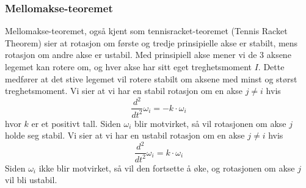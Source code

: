 \subsubsection{Mellomakse-teoremet}
Mellomakse-teoremet, også kjent som tennisracket-teoremet (Tennis Racket Theorem) \cite{DAMME:1} sier at rotasjon om første og tredje prinsipielle akse er stabilt, mens rotasjon om andre akse er ustabil. Med prinsipiell akse mener vi de $3$ aksene legemet kan rotere om, og hver akse har sitt eget treghetsmoment $I$. Dette medfører at det stive legemet vil rotere stabilt om aksene med minst og størst treghetsmoment.\newline\newline
Vi sier at vi har en stabil rotasjon om en akse $j\ne i$ hvis
\begin{equation}
\label{eqn:stabil}
    \frac{d^2}{dt^2}\omega_i=-k\cdot\omega_i
\end{equation}
hvor $k$ er et positivt tall. Siden $\omega_i$ blir motvirket, så vil rotasjonen om akse $j$ holde seg stabil.\newline\newline
Vi sier at vi har en ustabil rotasjon om en akse $j\ne i$ hvis
\begin{equation}
\label{eqn:ustabil}
    \frac{d^2}{dt^2}\omega_i=k\cdot\omega_i
\end{equation}
Siden $\omega_i$ ikke blir motvirket, så vil den fortsette å øke, og rotasjonen om akse $j$ vil bli ustabil.\newline\newline

